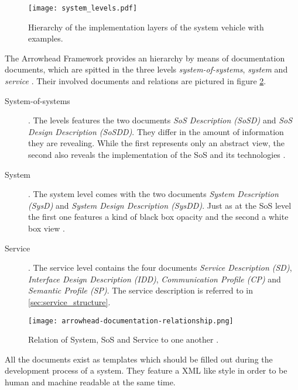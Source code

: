 \begin{figure}[!htbp]
\centering
\texttt{[image: system\_levels.pdf]}
\caption{Hierarchy of the implementation layers of the system vehicle with examples.}
\label{fig:integration_levels}
\end{figure}

The Arrowhead Framework provides an hierarchy by means of documentation documents, which are spitted in the three levels \emph{system-of-systems}, \emph{system} and \emph{service} \cite{arrowhead_inpr}. Their involved documents and relations are pictured in figure \ref{fig:sys-arrowhead}.

\begin{description}
\item [System-of-systems]. The levels features the two documents \emph{SoS Description (SoSD)} and \emph{SoS Design Description (SoSDD)}. They differ in the amount of information they are revealing. While the first represents only an abstract view, the second also reveals the implementation of the SoS and its technologies \cite{arrowhead_inpr}.
\item [System]. The system level comes with the two documents \emph{System Description (SysD)} and \emph{System Design Description (SysDD)}. Just as at the SoS level the first one features a kind of black box opacity and the second a white box view \cite{arrowhead_inpr}.
\item [Service]. The service level contains the four documents \emph{Service Description (SD)}, \emph{Interface Design Description (IDD)}, \emph{Communication Profile (CP)} and \emph{Semantic Profile (SP)}. The service description is referred to in \ref{sec:service_structure}.
\end{description}

\begin{figure}[!htbp]
\centering
\texttt{[image: arrowhead-documentation-relationship.png]}
\caption{Relation of System, SoS and Service to one another \cite{arrowhead:presentation}.}
\label{fig:sys-arrowhead}
\end{figure}

All the documents exist as templates which should be filled out during the development process of a system. They feature a XML like style in order to be human and machine readable at the same time.

